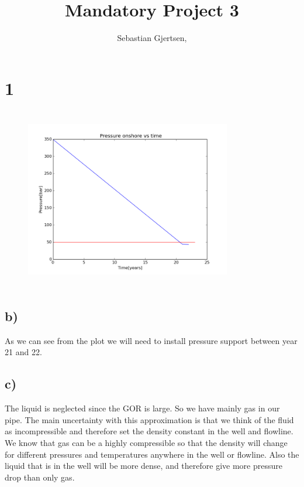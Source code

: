 \documentclass[DIV=calc, paper=a4, fontsize=13pt, twocolumn]{scrartcl}	 %
\title{Mandatory Project 3} %
\author{Sebastian Gjertsen, } %
\date{} %
\begin{document}
\maketitle %

\thispagestyle{fancy} %







\section*{1}
\begin{figure}[h]
\includegraphics[width=9cm,height=8cm]{Pressure_years.png}
\end{figure}
\subsection*{b)}
As we can see from the plot we will need to install pressure support between year 21 and 22.
\subsection*{c)}
The liquid is neglected since the GOR is large. So we have mainly gas in our pipe. The main uncertainty with this approximation is that we think of the fluid as incompressible and therefore set the density constant in the well and flowline. We know that gas can be a highly compressible so that the density will change for different pressures and temperatures anywhere in the well or flowline.
\newline
Also the liquid that is in the well will be more dense, and therefore give more pressure drop than only gas.
\end{document}
